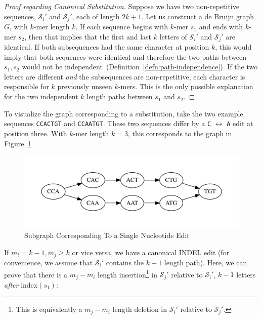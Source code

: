 \documentclass[11pt]{article}
\begin{document}
\begin{proof}[Proof regarding Canonical Substitution]
\label{proof:canonical-substitution}
Suppose we have two non-repetitive sequences, $\mathcal{S}_i'$ and $\mathcal{S}_j'$, each of length
$2k + 1$. Let us construct a de Bruijn graph $G$, with $k$-mer length $k$. If each sequence begins with
$k$-mer $s_1$ and ends with $k$-mer $s_2$, then that implies that the first and last $k$ letters of
$\mathcal{S}_i'$ and $\mathcal{S}_j'$ are identical. If both subsequences had the same character at
position $k$, this would imply that both sequences were identical and therefore the two paths between
$s_1, s_2$ would not be independent~(Definition~\ref{defn:path-independence}). If the two letters are
different \emph{and} the subsequences are non-repetitive, each character is responsible for $k$
previously unseen $k$-mers. This is the only possible explanation for the two independent $k$ length
paths between $s_1$ and $s_2$.
\end{proof}

To visualize the graph corresponding to a substitution, take the two example sequences \texttt{CCACTGT}
and \texttt{CCAATGT}. These two sequences differ by a \texttt{C} $\leftrightarrow$ \texttt{A} edit at
position three. With $k$-mer length $k = 3$, this corresponds to the graph in Figure~\ref{fig:sne}.

\begin{figure}[h]
\begin{center}
\includegraphics[width=0.5\linewidth, clip=true, trim=0 39 0 39]{graphs/sne.pdf}
\end{center}
\caption{Subgraph Corresponding To a Single Nucleotide Edit}
\label{fig:sne}
\end{figure}

If $m_i = k - 1, m_j \ge k$ or vice versa, we have a canonical INDEL edit (for convenience, we assume
that $\mathcal{S}_i'$ contains the $k - 1$ length path). Here, we can prove that there is a $m_j - m_i$
length insertion\footnote{This is equivalently a $m_j - m_i$ length deletion in $\mathcal{S}_i'$ relative to
$\mathcal{S}_j'$.} in $\mathcal{S}_j'$ relative to $\mathcal{S}_i'$, $k - 1$ letters \emph{after}
$\text{index}(s_1)$:
\end{document}
